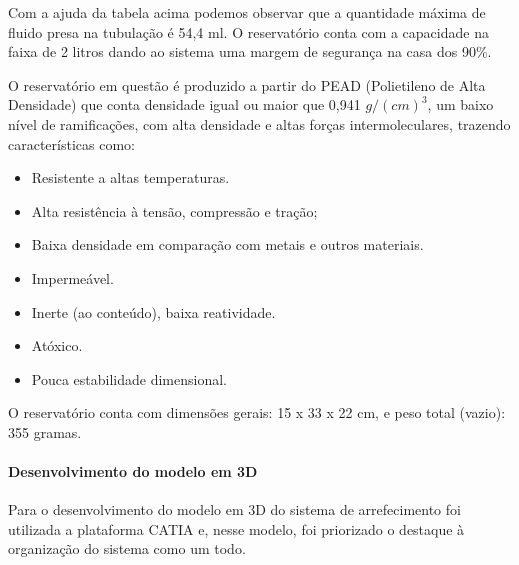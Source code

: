 Com a ajuda da tabela acima podemos observar que a quantidade máxima de fluido presa na tubulação é 54,4 ml. O reservatório conta com a capacidade na faixa de 2 litros dando ao sistema uma margem de segurança na casa dos 90\%. 

O reservatório em questão é produzido a partir do PEAD (Polietileno de Alta Densidade) que conta densidade igual ou maior que 0,941 $g/(cm)^3$, um baixo nível de ramificações, com alta densidade e altas forças intermoleculares, trazendo características como:

\begin{itemize}
\item Resistente a altas temperaturas.
\item Alta resistência à tensão, compressão e tração;
\item Baixa densidade em comparação com metais e outros materiais.
\item Impermeável.
\item Inerte (ao conteúdo), baixa reatividade.
\item Atóxico.
\item Pouca estabilidade dimensional.
\end{itemize}

O reservatório conta com dimensões gerais: 15 x 33 x 22 cm, e peso total (vazio): 355 gramas.

\paragraph{Desenvolvimento do modelo em 3D}

Para o desenvolvimento do modelo em 3D do sistema de arrefecimento foi utilizada a plataforma CATIA e, nesse modelo, foi priorizado o destaque à organização do sistema como um todo.
